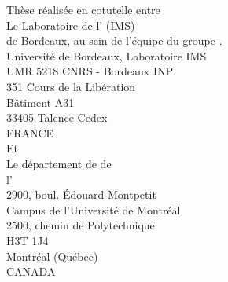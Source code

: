 \thispagestyle{empty}

\vspace*{\fill}

\begin{center}

Thèse réalisée en cotutelle entre \\
\vspace*{2em}
Le Laboratoire de l' (IMS)\\
de Bordeaux, au sein de l'équipe  du groupe .\\
\vspace*{1em}
Université de Bordeaux, Laboratoire IMS\\
UMR 5218 CNRS - Bordeaux INP\\
351 Cours de la Libération\\
Bâtiment A31\\
33405 Talence Cedex\\
FRANCE\\
\vspace*{2em}
Et\\
\vspace*{2em}
Le département de  de\\
l'\\
\vspace*{1em}
2900, boul. Édouard-Montpetit\\
Campus de l'Université de Montréal\\
2500, chemin de Polytechnique\\
H3T 1J4\\
Montréal (Québec)\\
CANADA


\end{center}